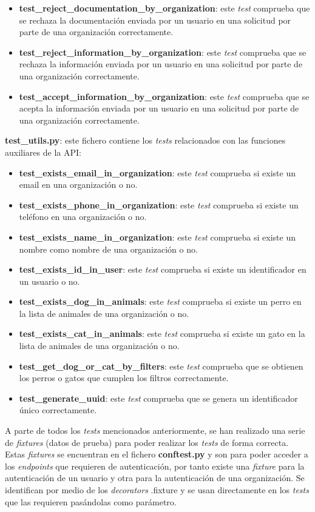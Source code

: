 \begin{itemize}
    \item \textbf{test\_reject\_documentation\_by\_organization}: este \textit{test} comprueba que se rechaza la documentación enviada por un usuario en una solicitud por parte de una organización correctamente.
    \item \textbf{test\_reject\_information\_by\_organization}: este \textit{test} comprueba que se rechaza la información enviada por un usuario en una solicitud por parte de una organización correctamente.
    \item \textbf{test\_accept\_information\_by\_organization}: este \textit{test} comprueba que se acepta la información enviada por un usuario en una solicitud por parte de una organización correctamente.
\end{itemize}

\textbf{test\_utils.py}: este fichero contiene los \textit{tests} relacionados con las funciones auxiliares de la API:

\begin{itemize}
    \item \textbf{test\_exists\_email\_in\_organization}: este \textit{test} comprueba si existe un email en una organización o no.
    \item \textbf{test\_exists\_phone\_in\_organization}: este \textit{test} comprueba si existe un teléfono en una organización o no.
    \item \textbf{test\_exists\_name\_in\_organization}: este \textit{test} comprueba si existe un nombre como nombre de una organización o no.
    \item \textbf{test\_exists\_id\_in\_user}: este \textit{test} comprueba si existe un identificador en un usuario o no.
    \item \textbf{test\_exists\_dog\_in\_animals}: este \textit{test} comprueba si existe un perro en la lista de animales de una organización o no.
    \item \textbf{test\_exists\_cat\_in\_animals}: este \textit{test} comprueba si existe un gato en la lista de animales de una organización o no.
    \item \textbf{test\_get\_dog\_or\_cat\_by\_filters}: este \textit{test} comprueba que se obtienen los perros o gatos que cumplen los filtros correctamente.
    \item \textbf{test\_generate\_uuid}: este \textit{test} comprueba que se genera un identificador único correctamente.
\end{itemize}

A parte de todos los \textit{tests} mencionados anteriormente, se han realizado una serie de \textit{fixtures} (datos de prueba) para poder realizar los \textit{tests} de forma correcta.
Estas \textit{fixtures} se encuentran en el fichero \textbf{conftest.py} y son para poder acceder a los \textit{endpoints} que requieren
de autenticación, por tanto existe una \textit{fixture} para la autenticación de un usuario y otra para la autenticación de una organización.
Se identifican por medio de los \textit{decorators} \@pytest.fixture y se usan directamente en los \textit{tests} que las requieren pasándolas como parámetro. \\

